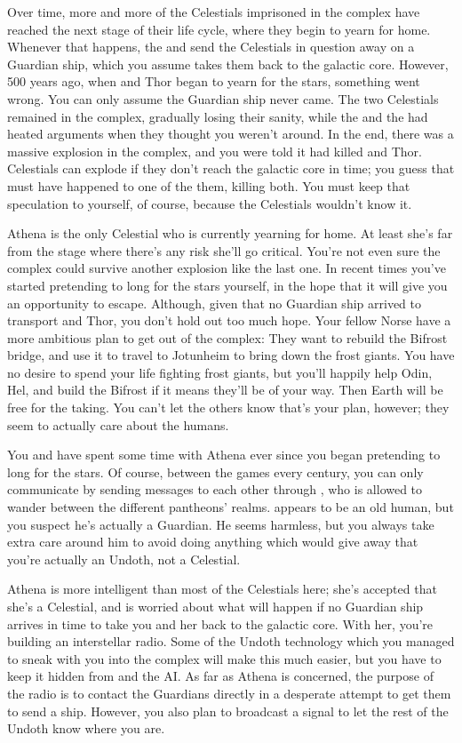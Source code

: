 \documentclass[char]{guardians}
\begin{document}
Over time, more and more of the Celestials imprisoned in the complex have reached the next stage of their life cycle, where they begin to yearn for home. Whenever that happens, the \cWarden{} and \cCaretaker{} send the Celestials in question away on a Guardian ship, which you assume takes them back to the galactic core. However, 500 years ago, when \cSet{} and Thor began to yearn for the stars, something went wrong. You can only assume the Guardian ship never came. The two Celestials remained in the complex, gradually losing their sanity, while the \cWarden{} and the \cCaretaker{} had heated arguments when they thought you weren't around. In the end, there was a massive explosion in the complex, and you were told it had killed \cSet{} and Thor. Celestials can explode if they don't reach the galactic core in time; you guess that must have happened to one of the them, killing both. You must keep that speculation to yourself, of course, because the Celestials wouldn't know it.

Athena is the only Celestial who is currently yearning for home. At least she's far from the stage where there's any risk she'll go critical. You're not even sure the complex could survive another explosion like the last one. In recent times you've started pretending to long for the stars yourself, in the hope that it will give you an opportunity to escape. Although, given that no Guardian ship arrived to transport \cSet{} and Thor, you don't hold out too much hope. Your fellow Norse have a more ambitious plan to get out of the complex: They want to rebuild the Bifrost bridge, and use it to travel to Jotunheim to bring down the frost giants. You have no desire to spend your life fighting frost giants, but you'll happily help Odin, Hel, and \cVal{} build the Bifrost if it means they'll be of your way. Then Earth will be free for the taking. You can't let the others know that's your plan, however; they seem to actually care about the humans.

You and \cVal{} have spent some time with Athena ever since you began pretending to long for the stars. Of course, between the games every century, you can only communicate by sending messages to each other through \cJascha{}, who is allowed to wander between the different pantheons' realms. \cJascha{} appears to be an old human, but you suspect he's actually a Guardian. He seems harmless, but you always take extra care around him to avoid doing anything which would give away that you're actually an Undoth, not a Celestial.

Athena is more intelligent than most of the Celestials here; she's accepted that she's a Celestial, and is worried about what will happen if no Guardian ship arrives in time to take you and her back to the galactic core. With her, you're building an interstellar radio. Some of the Undoth technology which you managed to sneak with you into the complex will make this much easier, but you have to keep it hidden from \cJascha{} and the AI. As far as Athena is concerned, the purpose of the radio is to contact the Guardians directly in a desperate attempt to get them to send a ship. However, you also plan to broadcast a signal to let the rest of the Undoth know where you are.
\end{document}
